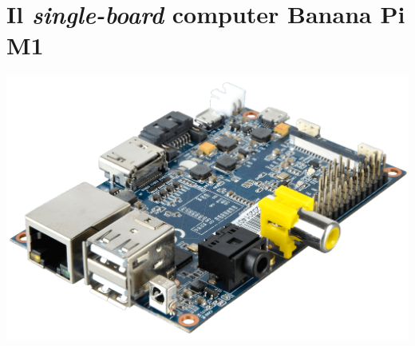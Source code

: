 \section{Il \emph{single-board} computer Banana Pi M1}
\begin{center}
\includegraphics[scale=0.175]{Figures/bananapi.png}\\[0.5cm]
\end{center}